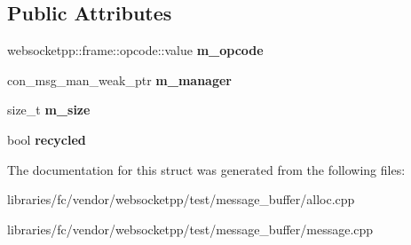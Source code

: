 \subsection*{Public Attributes}
\begin{DoxyCompactItemize}
\item 
\mbox{\label{structstub_a8d624b79f08779c30393ed271bde1e69}} 
websocketpp\+::frame\+::opcode\+::value {\bfseries m\+\_\+opcode}
\item 
\mbox{\label{structstub_a73f039832d3d871cd50247d50ce9f7ce}} 
con\+\_\+msg\+\_\+man\+\_\+weak\+\_\+ptr {\bfseries m\+\_\+manager}
\item 
\mbox{\label{structstub_abc19064870de3d4c3e94cec750b55afa}} 
size\+\_\+t {\bfseries m\+\_\+size}
\item 
\mbox{\label{structstub_a6dc1e6ab4823fdba8b071343904459f8}} 
bool {\bfseries recycled}
\end{DoxyCompactItemize}


The documentation for this struct was generated from the following files\+:\begin{DoxyCompactItemize}
\item 
libraries/fc/vendor/websocketpp/test/message\+\_\+buffer/alloc.\+cpp\item 
libraries/fc/vendor/websocketpp/test/message\+\_\+buffer/message.\+cpp\end{DoxyCompactItemize}
